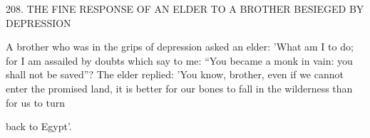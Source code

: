 208.
THE FINE RESPONSE OF AN ELDER
TO A BROTHER BESIEGED BY DEPRESSION

A brother who was in the grips of depression asked an elder: 'What
am I to do; for I am assailed by doubts which say to me: “You
became a monk in vain: you shall not be saved”? The elder replied:
'You know, brother, even if we cannot enter the promised land, it
is better for our bones to fall in the wilderness than for us to turn

back to Egypt'.

